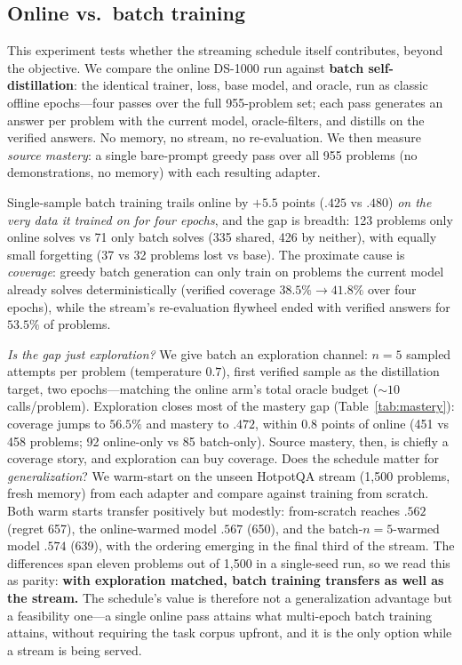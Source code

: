 \subsection{Online vs.\ batch training}
\label{sec:exp-transfer}

This experiment tests whether the streaming schedule itself contributes,
beyond the objective. We compare
the online DS-1000 run against \textbf{batch self-distillation}: the identical
trainer, loss, base model, and oracle, run as classic offline epochs---four
passes over the full 955-problem set; each pass generates an answer per problem
with the current model, oracle-filters, and distills on the verified answers.
No memory, no stream, no re-evaluation. We then measure \emph{source mastery}:
a single bare-prompt greedy pass over all 955 problems (no demonstrations, no
memory) with each resulting adapter.

\begin{table}[h]
\centering
\caption{Source-data mastery after training on DS-1000 (bare-prompt greedy pass,
all 955 problems).}
\label{tab:mastery}

\end{table}

Single-sample batch training trails online by $+5.5$ points ($.425$ vs $.480$)
\emph{on the very data it trained on for four epochs}, and the gap is breadth:
123 problems only online solves vs 71 only batch solves (335 shared, 426 by
neither), with equally small forgetting (37 vs 32 problems lost vs base). The
proximate cause is \emph{coverage}: greedy batch generation can only train on
problems the current model already solves deterministically (verified coverage
$38.5\% \to 41.8\%$ over four epochs), while the stream's re-evaluation
flywheel ended with verified answers for $53.5\%$ of problems.

\emph{Is the gap just exploration?} We give batch an exploration channel:
$n{=}5$ sampled attempts per problem (temperature $0.7$), first verified sample
as the distillation target, two epochs---matching the online arm's total oracle
budget (${\sim}10$ calls/problem). Exploration closes most of the mastery gap
(Table~\ref{tab:mastery}): coverage jumps to $56.5\%$ and mastery to $.472$,
within $0.8$ points of online (451 vs 458 problems; 92 online-only vs 85
batch-only). Source mastery, then, is chiefly a coverage story, and exploration
can buy coverage. Does the schedule matter for \emph{generalization}? We warm-start
\method{} on the unseen HotpotQA stream (1{,}500 problems, fresh memory) from
each adapter and compare against training from scratch. Both warm starts
transfer positively but modestly: from-scratch reaches $.562$ (regret 657),
the online-warmed model $.567$ (650), and the batch-$n{=}5$-warmed model
$.574$ (639), with the ordering emerging in the final third of the stream.
The differences span eleven problems out of 1{,}500 in a single-seed run, so
we read this as parity: \textbf{with exploration matched, batch training
transfers as well as the stream.} The schedule's value is therefore not a
generalization advantage but a feasibility one---a single online pass attains
what multi-epoch batch training attains, without requiring the task corpus
upfront, and it is the only option while a stream is being served.

